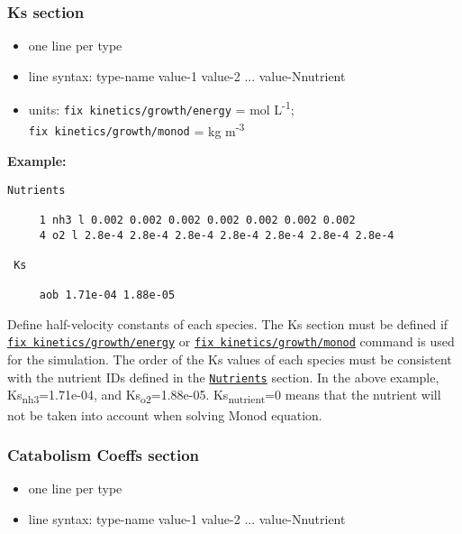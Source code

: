 \documentclass[11pt,a4paper,openright]{article}
\begin{document}
\newpage
\subsubsection{Ks section}
\label{sks}
\begin{itemize} [nosep]
    \item one line per type
    \item line syntax: type-name {} value-1 value-2 ... value-Nnutrient
    \item units: {\tt fix kinetics/growth/energy} = mol L\textsuperscript{-1};\\  
    {\tt fix kinetics/growth/monod} =  kg m\textsuperscript{-3}\\
    
\end{itemize} 

\textbf{Example:}
\begin{Verbatim}[frame=single]
 Nutrients

     1 nh3 l 0.002 0.002 0.002 0.002 0.002 0.002 0.002
     4 o2 l 2.8e-4 2.8e-4 2.8e-4 2.8e-4 2.8e-4 2.8e-4 2.8e-4
     
 Ks
     
     aob 1.71e-04 1.88e-05

\end{Verbatim}

Define half-velocity constants of each species. 
The Ks section must be defined if 
\hyperref[fkineticsenergy]{\tt fix kinetics/growth/energy} or 
\hyperref[fkineticsmonod]{\tt fix kinetics/growth/monod} 
command is used for the simulation. 
The order of the Ks values of each species must be consistent 
with the nutrient IDs defined in the \hyperref[snutrients]{\tt Nutrients} section.
In the above example, Ks\textsubscript{nh3}=1.71e-04, and Ks\textsubscript{o2}=1.88e-05.
Ks\textsubscript{nutrient}=0 means that the nutrient will not be taken into account
when solving Monod equation.


\subsubsection{Catabolism Coeffs section}
\label{scata}
\begin{itemize} [nosep]
    \item one line per type
    \item line syntax: type-name {} value-1 value-2 ... value-Nnutrient\\
    
\end{itemize} 
\end{document}

